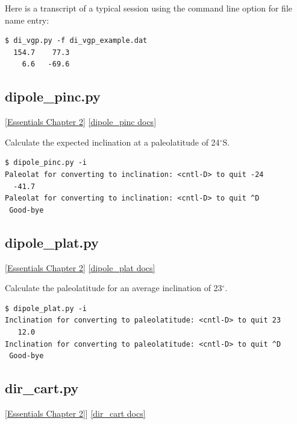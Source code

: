 \documentclass[11pt]{book}
\begin{document}
{{{Here is a transcript of a typical session using the command line option for file name entry:

\begin{verbatim}
$ di_vgp.py -f di_vgp_example.dat
  154.7    77.3
    6.6   -69.6
\end{verbatim}

\subsection{dipole\_pinc.py}
\href{http://earthref.org/MAGIC/books/Tauxe/Essentials/WebBook3ch2.html#Virtual_geomagnetic_poles}{[Essentials Chapter  2]}
\href{https://github.com/PmagPy/PmagPy/blob/master/programs/dipole_pinc.py}{[dipole\_pinc docs]}

Calculate the expected inclination at a paleolatitude of 24$^{\circ}$S.

\begin{verbatim}
$ dipole_pinc.py -i
Paleolat for converting to inclination: <cntl-D> to quit -24
  -41.7
Paleolat for converting to inclination: <cntl-D> to quit ^D
 Good-bye

\end{verbatim}

\subsection{dipole\_plat.py}
\href{http://earthref.org/MAGIC/books/Tauxe/Essentials/WebBook3ch2.html#Virtual_geomagnetic_poles}{[Essentials Chapter  2]}
\href{https://github.com/PmagPy/PmagPy/blob/master/programs/dipole_plat.py}{[dipole\_plat docs]}


Calculate the paleolatitude for an average inclination of 23$^{\circ}$.

\begin{verbatim}
$ dipole_plat.py -i
Inclination for converting to paleolatitude: <cntl-D> to quit 23
   12.0
Inclination for converting to paleolatitude: <cntl-D> to quit ^D
 Good-bye
\end{verbatim}

\subsection {dir\_cart.py} \href{http://earthref.org/MAGIC/books/Tauxe/Essentials/WebBook3ch2.html#ch2}{[Essentials Chapter 2]}]
\href{https://github.com/PmagPy/PmagPy/blob/master/programs/dir_cart.py}{[dir\_cart docs]}

}}}
\end{document}
